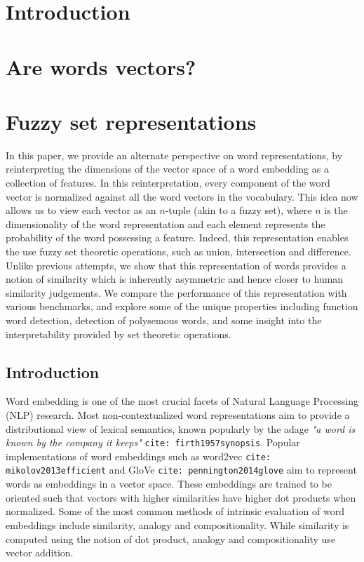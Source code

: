 \documentclass{book}
\newcommand{\citep}[1]{\texttt{cite: #1}}
\begin{document}
\tableofcontents
\chapter{Introduction}
\chapter{Are words vectors?}
\chapter{Fuzzy set representations}

In this paper, we provide an alternate perspective on word representations, by reinterpreting the dimensions of the vector space of a word embedding as a collection of features. In this reinterpretation, every component of the word vector is normalized against all the word vectors in the vocabulary. This idea now allows us to view each vector as an $n$-tuple (akin to a fuzzy set), where $n$ is the dimensionality of the word representation and each element represents the probability of the word possessing a feature. Indeed, this representation enables the use fuzzy set theoretic operations, such as union, intersection and difference. Unlike previous attempts, we show that this representation of words provides a notion of similarity which is inherently asymmetric and hence closer to human similarity judgements. We compare the performance of this representation with various benchmarks, and explore some of the unique properties including function word detection, detection of polysemous words, and some insight into the interpretability provided by set theoretic operations.

\section{Introduction}
\label{sec: intro}

Word embedding is one of the most crucial facets of Natural Language Processing (NLP) research. Most non-contextualized word representations aim to provide a distributional view of lexical semantics, known popularly by the adage \textit{"a word is known by the company it keeps"} \citep{firth1957synopsis}. Popular implementations of word embeddings such as word2vec \citep{mikolov2013efficient} and GloVe \citep{pennington2014glove} aim to represent words as embeddings in a vector space. These embeddings are trained to be oriented such that vectors with higher similarities have higher dot products when normalized. Some of the most common methods of intrinsic evaluation of word embeddings include similarity, analogy and compositionality. While similarity is computed using the notion of dot product, analogy and compositionality use vector addition.
\end{document}
